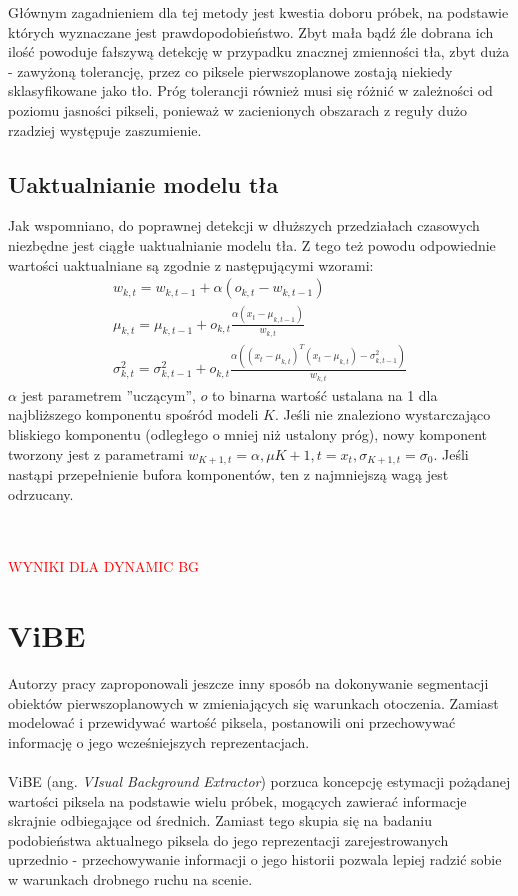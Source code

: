 Głównym zagadnieniem dla tej metody jest kwestia doboru próbek, na podstawie których wyznaczane jest prawdopodobieństwo. Zbyt mała bądź źle dobrana ich ilość powoduje fałszywą detekcję w przypadku znacznej zmienności tła, zbyt duża - zawyżoną tolerancję, przez co piksele pierwszoplanowe zostają niekiedy sklasyfikowane jako tło. Próg tolerancji również musi się różnić w zależności od poziomu jasności pikseli, ponieważ w zacienionych obszarach z reguły dużo rzadziej występuje zaszumienie.
\subsection{Uaktualnianie modelu tła}
Jak wspomniano, do poprawnej detekcji w dłuższych przedziałach czasowych niezbędne jest ciągłe uaktualnianie modelu tła. Z tego też powodu odpowiednie wartości uaktualniane są zgodnie z następującymi wzorami:
\begin{gather}
w_{k,t} = w_{k,t-1}+\alpha(o_{k,t}-w_{k,t-1}) \\
\mu_{k,t} = \mu_{k,t-1}+o_{k,t}\frac{\alpha (x_{t}-\mu_{k,t-1})}{w_{k,t}} \\
\sigma^2_{k,t} = \sigma^2_{k,t-1}+o_{k,t}\frac{\alpha ((x_{t}-\mu_{k,t})^{T}(x_{t}-\mu_{k,t})-\sigma^2_{k,t-1})}{w_{k,t}}
\end{gather}
$\alpha$ jest parametrem ''uczącym'', $o$ to binarna wartość ustalana na 1 dla najbliższego komponentu spośród modeli $K$. Jeśli nie znaleziono wystarczająco bliskiego komponentu (odległego o mniej niż ustalony próg), nowy komponent tworzony jest z parametrami $w_{K+1,t} = \alpha, \mu{K+1,t}= x_{t}, \sigma_{K+1,t}=\sigma_{0}$. Jeśli nastąpi przepełnienie bufora komponentów, ten z najmniejszą wagą jest odrzucany. \\ \\ \\
\begin{LARGE}
\textcolor{red}{WYNIKI DLA DYNAMIC BG}
\end{LARGE}
\section{ViBE}
Autorzy pracy \cite{barnich2011vibe} zaproponowali jeszcze inny sposób na dokonywanie segmentacji obiektów pierwszoplanowych w zmieniających się warunkach otoczenia. Zamiast modelować i przewidywać wartość piksela, postanowili oni przechowywać informację o jego wcześniejszych reprezentacjach.
\paragraph{}
ViBE (ang. \textit{VIsual Background Extractor}) porzuca koncepcję estymacji pożądanej wartości piksela na podstawie wielu próbek, mogących zawierać informacje skrajnie odbiegające od średnich. Zamiast tego skupia się na badaniu podobieństwa aktualnego piksela do jego reprezentacji zarejestrowanych uprzednio - przechowywanie informacji o jego historii pozwala lepiej radzić sobie w warunkach drobnego ruchu na scenie.
